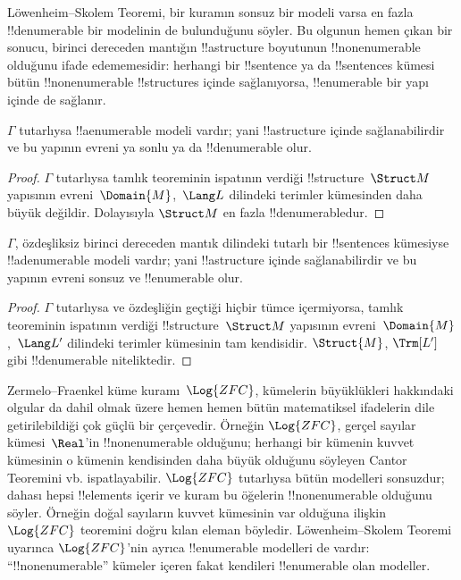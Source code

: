 \documentclass[../../../include/open-logic-section]{subfiles}
\begin{document}

Löwenheim--Skolem Teoremi, bir kuramın sonsuz bir modeli varsa en fazla
!!{denumerable} bir modelinin de bulunduğunu söyler. Bu olgunun hemen
çıkan bir sonucu, birinci dereceden mantığın !!a{structure} boyutunun
!!{nonenumerable} olduğunu ifade edememesidir: herhangi bir !!{sentence}
ya da !!{sentence}s kümesi bütün !!{nonenumerable} !!{structure}s içinde
sağlanıyorsa, !!{enumerable} bir yapı içinde de sağlanır.

\begin{thm}
 $\Gamma$ tutarlıysa !!a{enumerable} modeli
vardır; yani !!a{structure} içinde sağlanabilirdir ve bu yapının evreni
ya sonlu ya da !!{denumerable} olur.
\end{thm}

\begin{proof}
$\Gamma$ tutarlıysa tamlık teoreminin ispatının verdiği
!!{structure}~$\Struct M$ yapısının evreni~$\Domain{M}$,~$\Lang L$
dilindeki terimler kümesinden daha büyük değildir. Dolayısıyla
$\Struct M$ en fazla !!{denumerable}{}dur.
\end{proof}

\begin{thm}
 $\Gamma$, özdeşliksiz birinci dereceden mantık
dilindeki tutarlı bir !!{sentence}s kümesiyse !!a{denumerable} modeli
vardır; yani !!a{structure} içinde sağlanabilirdir ve bu yapının evreni
sonsuz ve !!{enumerable} olur.
\end{thm}

\begin{proof}
$\Gamma$ tutarlıysa ve özdeşliğin geçtiği hiçbir tümce içermiyorsa,
tamlık teoreminin ispatının verdiği !!{structure}~$\Struct M$ yapısının
evreni~$\Domain{M}$,~$\Lang L'$ dilindeki terimler kümesinin tam
kendisidir. $\Struct{M}$, $\Trm[L']$ gibi !!{denumerable} niteliktedir.
\end{proof}

\begin{ex}
Zermelo--Fraenkel küme kuramı~$\Log{ZFC}$, kümelerin büyüklükleri
hakkındaki olgular da dahil olmak üzere hemen hemen bütün matematiksel
ifadelerin dile getirilebildiği çok güçlü bir çerçevedir. Örneğin
$\Log{ZFC}$, gerçel sayılar kümesi~$\Real$'in !!{nonenumerable}
olduğunu; herhangi bir kümenin kuvvet kümesinin o kümenin kendisinden
daha büyük olduğunu söyleyen Cantor Teoremini vb. ispatlayabilir.
$\Log{ZFC}$ tutarlıysa bütün modelleri sonsuzdur; dahası hepsi
!!{element}s içerir ve kuram bu öğelerin !!{nonenumerable} olduğunu söyler.
Örneğin doğal sayıların kuvvet kümesinin var olduğuna ilişkin
$\Log{ZFC}$ teoremini doğru kılan eleman böyledir. Löwenheim--Skolem
Teoremi uyarınca $\Log{ZFC}$'nin ayrıca !!{enumerable} modelleri de
vardır: ``!!{nonenumerable}'' kümeler içeren fakat kendileri
!!{enumerable} olan modeller.
\end{ex}
\end{document}
